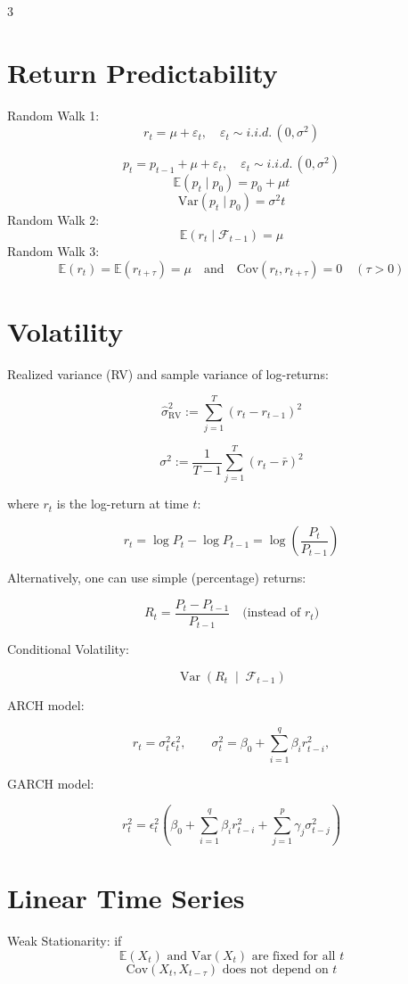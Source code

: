 \documentclass[10pt,a4paper]{article}
\begin{document}
\begin{multicols}{3}
\section*{Return Predictability}
Random Walk 1:
\[
r_t = \mu + \varepsilon_t, \quad \varepsilon_t \sim i.i.d. \, (0, \sigma^2)
\]

\[
p_t = p_{t-1} + \mu + \varepsilon_t, \quad \varepsilon_t \sim i.i.d. \, (0, \sigma^2)
\]
\[
\mathbb{E}(p_t \mid p_0) = p_0 + \mu t
\]
\[
\mathrm{Var}(p_t \mid p_0) = \sigma^2 t
\]
Random Walk 2:
\[
\mathbb{E}(r_t \mid \mathcal{F}_{t-1}) = \mu
\]
Random Walk 3:
\[
\mathbb{E}(r_t) = \mathbb{E}(r_{t+\tau}) = \mu \quad \text{and} \quad \mathrm{Cov}(r_t, r_{t+\tau}) = 0 \quad (\tau > 0)
\]
\section*{Volatility}
Realized variance (RV) and sample variance of log-returns:

\[
\widehat{\sigma}^2_{\mathrm{RV}} := \sum_{j=1}^{T} (r_t - r_{t-1})^2
\]

\[
\sigma^2 := \frac{1}{T-1} \sum_{j=1}^{T} (r_t - \bar{r})^2
\]

where \( r_t \) is the log-return at time \( t \):

\[
r_t = \log P_t - \log P_{t-1} = \log \left( \frac{P_t}{P_{t-1}} \right)
\]

Alternatively, one can use simple (percentage) returns:

\[
R_t = \frac{P_t - P_{t-1}}{P_{t-1}} \quad \text{(instead of } r_t\text{)}
\]

Conditional Volatility:

\[
\operatorname{Var}\left( R_t \;\middle|\; \mathcal{F}_{t-1} \right)
\]

ARCH model:

\[
r_t = \sigma_t^2 \epsilon_t^2, \qquad \sigma_t^2 = \beta_0 + \sum_{i=1}^q \beta_i r_{t-i}^2,
\]

GARCH model:

\[
r_t^2 = \epsilon_t^2 \left( \beta_0 + \sum_{i=1}^q \beta_i r_{t-i}^2 + \sum_{j=1}^p \gamma_j \sigma_{t-j}^2 \right)
\]

\section*{Linear Time Series}
Weak Stationarity: if \[\mathbb{E}(X_t) \text{ and } \mathrm{Var}(X_t) \text{ are fixed for all } t\]
\[
\mathrm{Cov}(X_t, X_{t-\tau}) \text{ does not depend on } t
\]


\end{multicols}
\end{document}

